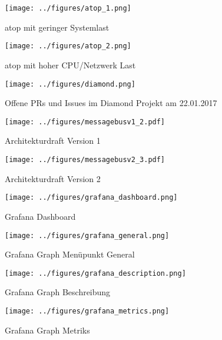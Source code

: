 \begin{figure}[tbph]
  \centering
  \texttt{[image: ../figures/atop\_1.png]}
  \caption{atop mit geringer Systemlast}
\label{figure:atop1}
\end{figure}

\begin{figure}[tbp]
  \centering
  \texttt{[image: ../figures/atop\_2.png]}
  \caption{atop mit hoher CPU/Netzwerk Last}
\label{figure:atop2}
\end{figure}

\begin{figure}[tbp]
  \centering
  \texttt{[image: ../figures/diamond.png]}
  \caption{Offene PRs und Issues im Diamond Projekt am 22.01.2017}
\label{figure:diamond}
\end{figure}

\begin{figure}[tbp]
  \centering
  \texttt{[image: ../figures/messagebusv1\_2.pdf]}
  \caption{Architekturdraft Version 1}
\label{figure:draft1}
\end{figure}
\begin{figure}[tbp]
  \centering
  \texttt{[image: ../figures/messagebusv2\_3.pdf]}
  \caption{Architekturdraft Version 2}
\label{figure:draft2}
\end{figure}
\FloatBarrier{}

\begin{figure}[tbp]
  \centering
  \texttt{[image: ../figures/grafana\_dashboard.png]}
  \caption{Grafana Dashboard}
\label{figure:grafana_dashboard}
\end{figure}

\begin{figure}[tbp]
  \centering
  \texttt{[image: ../figures/grafana\_general.png]}
  \caption{Grafana Graph Menüpunkt General}
\label{figure:grafana_general}
\end{figure}

\begin{figure}[tbp]
  \centering
  \texttt{[image: ../figures/grafana\_description.png]}
  \caption{Grafana Graph Beschreibung}
\label{figure:grafana_description}
\end{figure}

\begin{figure}[tbp]
  \centering
  \texttt{[image: ../figures/grafana\_metrics.png]}
  \caption{Grafana Graph Metriks}
\label{figure:grafana_metrics}
\end{figure}

